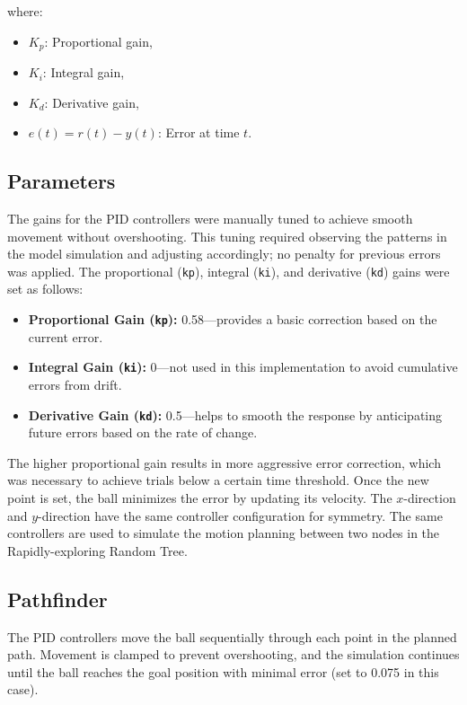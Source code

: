 \documentclass[12pt]{article}
\begin{document}
where:
\begin{itemize}
    \item \( K_p \): Proportional gain,
    \item \( K_i \): Integral gain,
    \item \( K_d \): Derivative gain,
    \item \( e(t) = r(t) - y(t) \): Error at time \( t \).
\end{itemize}

\subsection{Parameters}
The gains for the PID controllers were manually tuned to achieve smooth movement without overshooting. This tuning required observing the patterns in the model simulation and adjusting accordingly; no penalty for previous errors was applied. The proportional (\texttt{kp}), integral (\texttt{ki}), and derivative (\texttt{kd}) gains were set as follows:
\begin{itemize}
    \item \textbf{Proportional Gain (\texttt{kp}):} 0.58---provides a basic correction based on the current error.
    \item \textbf{Integral Gain (\texttt{ki}):} 0---not used in this implementation to avoid cumulative errors from drift.
    \item \textbf{Derivative Gain (\texttt{kd}):} 0.5---helps to smooth the response by anticipating future errors based on the rate of change.
\end{itemize}

The higher proportional gain results in more aggressive error correction, which was necessary to achieve trials below a certain time threshold. Once the new point is set, the ball minimizes the error by updating its velocity. The \(x\)-direction and \(y\)-direction have the same controller configuration for symmetry. The same controllers are used to simulate the motion planning between two nodes in the Rapidly-exploring Random Tree.

\subsection{Pathfinder}
The PID controllers move the ball sequentially through each point in the planned path. Movement is clamped to prevent overshooting, and the simulation continues until the ball reaches the goal position with minimal error (set to 0.075 in this case). 
\end{document}
